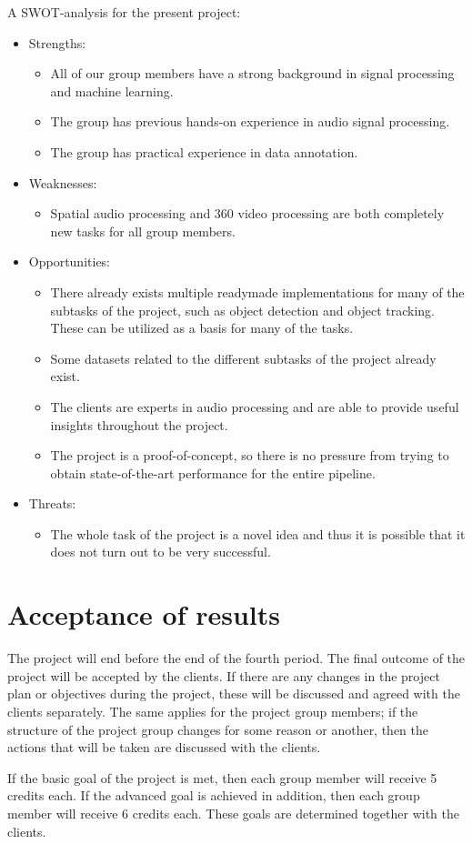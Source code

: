 A SWOT-analysis for the present project:
\begin{itemize}
    \item Strengths:
    \begin{itemize}
        \item All of our group members have a strong background in signal processing and machine learning.
        \item The group has previous hands-on experience in audio signal processing.
        \item The group has practical experience in data annotation.
    \end{itemize}
    \item Weaknesses:
    \begin{itemize}
        \item Spatial audio processing and 360 video processing are both completely new tasks for all group
        members.
    \end{itemize}
    \item Opportunities:
    \begin{itemize}
        \item There already exists multiple readymade implementations for many of the subtasks of the project,
        such as object detection and object tracking. These can be utilized as a basis for many of the tasks.
        \item Some datasets related to the different subtasks of the project already exist.
        \item The clients are experts in audio processing and are able to provide useful insights throughout the
        project.
        \item The project is a proof-of-concept, so there is no pressure from trying to obtain state-of-the-art
        performance for the entire pipeline.
    \end{itemize}
    \item Threats:
    \begin{itemize}
        \item The whole task of the project is a novel idea and thus it is possible that it does not turn out to
        be very successful.
    \end{itemize}
\end{itemize}


\section{Acceptance of results}

The project will end before the end of the fourth period. The final outcome of the project will be accepted by the
clients. If there are any changes in the project plan or objectives during the project, these will be discussed
and agreed with the clients separately. The same applies for the project group members; if the structure of the
project group changes for some reason or another, then the actions that will be taken are discussed with the
clients.

If the basic goal of the project is met, then each group member will receive 5 credits each. If the advanced goal
is achieved in addition, then each group member will receive 6 credits each. These goals are determined together
with the clients.